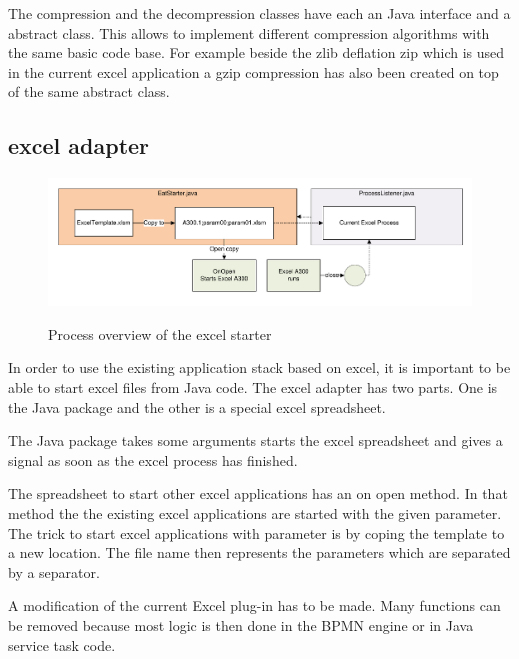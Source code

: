 \documentclass[paper=a4,twoside=false,BCOR=0mm,DIV=calc,fontsize=12pt]{scrartcl}
\begin{document}
The compression and the decompression classes have each an Java interface and a abstract class. This allows to implement different compression algorithms with the same basic code base. For example beside the zlib deflation zip which is used in the current excel application a gzip compression has also been created on top of the same abstract class.


\subsection{excel adapter}

\begin{figure}
    \begin{center}
      \includegraphics[width=1\textwidth]{./img/eatstarterOverview.pdf}\\
    \end{center}
  \caption{Process overview of the excel starter}
  \label{eatstarteroverview}
\end{figure} 

In order to use the existing application stack based on excel, it is important to be able to start excel files from Java code. 
The excel adapter has two parts. One is the Java package and the other is a special excel spreadsheet. 

The Java package takes some arguments starts the excel spreadsheet and gives a signal as soon as the excel process has finished.

The spreadsheet to start other excel applications has an on open method. In that method the the existing excel applications are started with the given parameter. The trick to start excel applications with parameter is by coping the template to a new location. The file name then represents the parameters which are separated by a separator.

A modification of the current Excel plug-in has to be made. Many functions can be removed because most logic is then done in the BPMN engine or in Java service task code.
\end{document}
